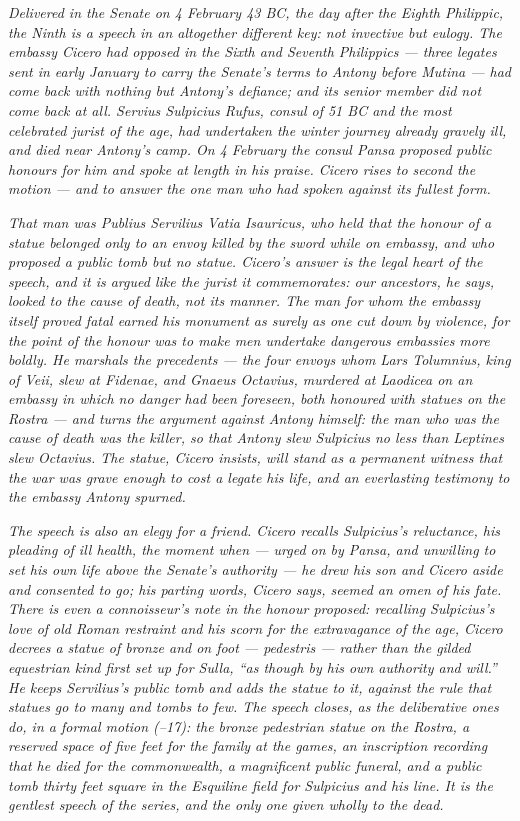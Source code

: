 
\textit{Delivered in the Senate on 4 February 43 BC, the day after
the Eighth Philippic, the Ninth is a speech in an altogether
different key: not invective but eulogy. The embassy Cicero had
opposed in the Sixth and Seventh Philippics --- three legates sent
in early January to carry the Senate's terms to Antony before
Mutina --- had come back with nothing but Antony's defiance; and
its senior member did not come back at all. Servius Sulpicius
Rufus, consul of 51 BC and the most celebrated jurist of the age,
had undertaken the winter journey already gravely ill, and died
near Antony's camp. On 4 February the consul Pansa proposed public
honours for him and spoke at length in his praise. Cicero rises to
second the motion --- and to answer the one man who had spoken
against its fullest form.}

\textit{That man was Publius Servilius Vatia Isauricus, who held
that the honour of a statue belonged only to an envoy killed by
the sword while on embassy, and who proposed a public tomb but no
statue. Cicero's answer is the legal heart of the speech, and it
is argued like the jurist it commemorates: our ancestors, he says,
looked to the cause of death, not its manner. The man for whom the
embassy itself proved fatal earned his monument as surely as one
cut down by violence, for the point of the honour was to make men
undertake dangerous embassies more boldly. He marshals the
precedents --- the four envoys whom Lars Tolumnius, king of Veii,
slew at Fidenae, and Gnaeus Octavius, murdered at Laodicea on an
embassy in which no danger had been foreseen, both honoured with
statues on the Rostra --- and turns the argument against Antony
himself: the man who was the cause of death was the killer, so that
Antony slew Sulpicius no less than Leptines slew Octavius. The
statue, Cicero insists, will stand as a permanent witness that the
war was grave enough to cost a legate his life, and an everlasting
testimony to the embassy Antony spurned.}

\textit{The speech is also an elegy for a friend. Cicero recalls
Sulpicius's reluctance, his pleading of ill health, the moment
when --- urged on by Pansa, and unwilling to set his own life
above the Senate's authority --- he drew his son and Cicero aside
and consented to go; his parting words, Cicero says, seemed an omen
of his fate. There is even a connoisseur's note in the honour
proposed: recalling Sulpicius's love of old Roman restraint and his
scorn for the extravagance of the age, Cicero decrees a statue of
bronze and on foot --- \textit{pedestris} --- rather than the
gilded equestrian kind first set up for Sulla, ``as though by his
own authority and will.'' He keeps Servilius's public tomb and adds
the statue to it, against the rule that statues go to many and tombs
to few. The speech closes, as the deliberative ones do, in a formal
motion (--17): the bronze pedestrian statue on the
Rostra, a reserved space of five feet for the family at the games,
an inscription recording that he died for the commonwealth, a
magnificent public funeral, and a public tomb thirty feet square in
the Esquiline field for Sulpicius and his line. It is the gentlest
speech of the series, and the only one given wholly to the dead.}
